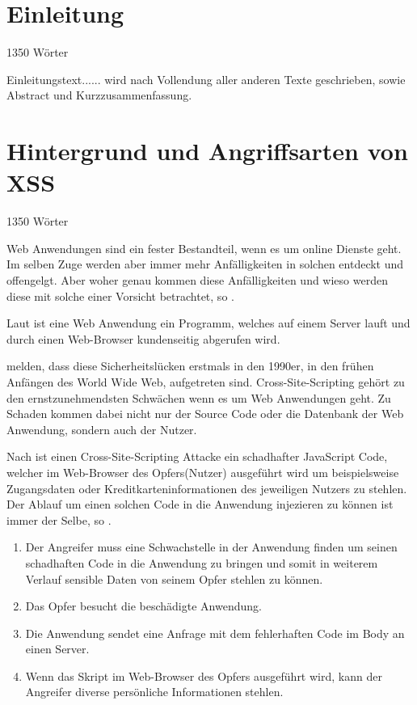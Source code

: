 \section{Einleitung}
\label{section:Introduction} 1350 Wörter

Einleitungstext......
wird nach Vollendung aller anderen Texte geschrieben, sowie Abstract und Kurzzusammenfassung.

\section{Hintergrund und Angriffsarten von XSS}
\label{section:History} 1350 Wörter

Web Anwendungen sind ein fester Bestandteil, wenn es um online Dienste geht. Im selben Zuge werden aber immer mehr Anfälligkeiten in solchen entdeckt und offengelgt. Aber woher genau kommen diese Anfälligkeiten und wieso werden diese mit solche einer Vorsicht betrachtet, so \textcite{kirda2009}.

Laut \textcite[p.1]{mahmoud2017} ist eine Web Anwendung ein Programm, welches auf einem Server lauft und durch einen Web-Browser kundenseitig abgerufen wird.

\textcite[p.2]{hydara2015} melden, dass diese Sicherheitslücken erstmals in den 1990er, in den frühen Anfängen des World Wide Web, aufgetreten sind. Cross-Site-Scripting gehört zu den ernstzunehmendsten Schwächen wenn es um Web Anwendungen geht. Zu Schaden kommen dabei nicht nur der Source Code oder die Datenbank der Web Anwendung, sondern auch der Nutzer.



Nach \textcite[p.1]{mahmoud2017} ist einen Cross-Site-Scripting Attacke ein schadhafter JavaScript Code, welcher im Web-Browser des Opfers(Nutzer) ausgeführt wird um beispielsweise Zugangsdaten oder Kreditkarteninformationen des jeweiligen Nutzers zu stehlen.
Der Ablauf um einen solchen Code in die Anwendung injezieren zu können ist immer der Selbe, so \textcite{mahmoud2017}.
\begin{enumerate}
	\item Der Angreifer muss eine Schwachstelle in der Anwendung finden um seinen schadhaften Code in die Anwendung zu bringen und somit in weiterem Verlauf sensible Daten von seinem Opfer stehlen zu können.
	\item Das Opfer besucht die beschädigte Anwendung.
	\item Die Anwendung sendet eine Anfrage mit dem fehlerhaften Code im Body an einen Server.
	\item Wenn das Skript im Web-Browser des Opfers ausgeführt wird, kann der Angreifer diverse persönliche Informationen stehlen.
\end{enumerate}

